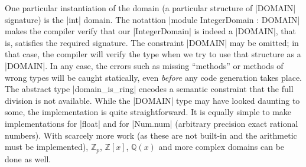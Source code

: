 \documentclass{llncs}
\begin{document}
One particular instantiation of the domain (a particular structure of
|DOMAIN| signature) is the |int| domain. The notattion
|module IntegerDomain : DOMAIN| makes the compiler
verify that our |IntegerDomain| is indeed a |DOMAIN|, that is,
satisfies the required signature. The constraint |DOMAIN| may be
omitted; in that case, the compiler will verify the type when we try
to use that structure as a |DOMAIN|. In any case, the errors such as
missing ``methods'' or methods of wrong types will be caught
statically, even \emph{before} any code generation takes place. The
abstract type |domain_is_ring| encodes a semantic constraint that the
full division is not available. While the |DOMAIN| type may have
looked daunting to some, the implementation is quite straightforward.
It is equally simple to make implementations for |float| and for
|Num.num| (arbitrary precision exact rational numbers).  With scarcely
more work (as these are not built-in and the arithmetic must be
implemented), $\mathbb{Z}_p$, $\mathbb{Z}\left[x\right]$,
$\mathbb{Q}\left(x\right)$ and more complex domains can be done as
well.
\end{document}
